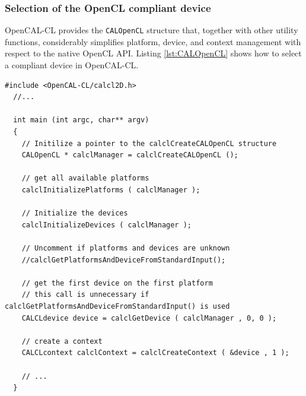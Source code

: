 \subsubsection{Selection of the OpenCL compliant device}

OpenCAL-CL provides the \verb'CALOpenCL' structure that, together with
other utility functions, considerably simplifies platform, device, and
context management with respect to the native OpenCL API. Listing
\ref{lst:CALOpenCL} shows how to select a compliant device in
OpenCAL-CL.

\begin{lstlisting}[float,floatplacement=H, label=lst:CALOpenCL, caption=Access to platform and devices.]
  #include <OpenCAL-CL/calcl2D.h>
  //...

  int main (int argc, char** argv)
  {
    // Initilize a pointer to the calclCreateCALOpenCL structure
    CALOpenCL * calclManager = calclCreateCALOpenCL ();

    // get all available platforms
    calclInitializePlatforms ( calclManager );

    // Initialize the devices
    calclInitializeDevices ( calclManager );

    // Uncomment if platforms and devices are unknown
    //calclGetPlatformsAndDeviceFromStandardInput();

    // get the first device on the first platform
    // this call is unnecessary if calclGetPlatformsAndDeviceFromStandardInput() is used
    CALCLdevice device = calclGetDevice ( calclManager , 0, 0 );

    // create a context
    CALCLcontext calclContext = calclCreateContext ( &device , 1 );

    // ...
  }
\end{lstlisting}

